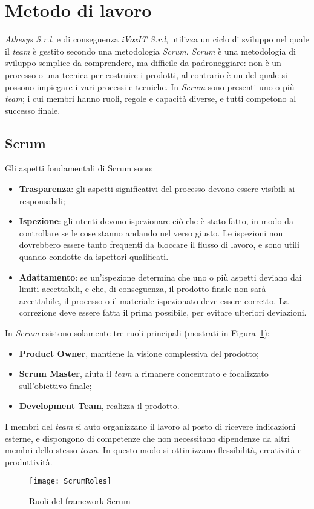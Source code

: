 \section{Metodo di lavoro}
\textit{Athesys S.r.l}, e di conseguenza \textit{iVoxIT S.r.l}, utilizza un ciclo di sviluppo  nel quale il \textit{team} è gestito secondo una metodologia \textit{Scrum}. \textit{Scrum} è una metodologia di sviluppo semplice da comprendere, ma difficile da padroneggiare: non è un processo o una tecnica per costruire i prodotti, al contrario è un  del quale si possono impiegare i vari processi e tecniche. In \textit{Scrum} sono presenti uno o più \textit{team}; i cui membri hanno ruoli, regole e capacità diverse, e tutti competono al successo finale.

\subsection{Scrum}
 Gli aspetti fondamentali di Scrum sono:
\begin{itemize}
\item \textbf{Trasparenza}: gli aspetti significativi del processo devono essere visibili ai responsabili;
\item \textbf{Ispezione}: gli utenti devono ispezionare ciò che è stato fatto, in modo da controllare se le cose stanno andando nel verso giusto. Le ispezioni non dovrebbero essere tanto frequenti da bloccare il flusso di lavoro, e sono utili quando condotte da ispettori qualificati.
\item \textbf{Adattamento}: se un'ispezione determina che uno o più aspetti deviano dai limiti accettabili, e che, di conseguenza, il prodotto finale non sarà accettabile, il processo o il materiale ispezionato deve essere corretto. La correzione deve essere fatta il prima possibile, per evitare ulteriori deviazioni.
\end{itemize}
In \textit{Scrum} esistono solamente tre ruoli principali (mostrati in Figura~\ref{fig:scrumroles}):
\begin{itemize}
\item \textbf{Product Owner}, mantiene la visione complessiva del prodotto;
\item \textbf{Scrum Master}, aiuta il \textit{team} a rimanere concentrato e focalizzato sull'obiettivo finale;
\item \textbf{Development Team}, realizza il prodotto.
\end{itemize}
I membri del \textit{team} si auto organizzano il lavoro al posto di ricevere indicazioni esterne, e dispongono di competenze che non necessitano dipendenze da altri membri dello stesso \textit{team}. In questo modo si ottimizzano flessibilità, creatività e produttività.
\begin{figure}[h]
\begin{center}
\texttt{[image: ScrumRoles]}
\caption[Ruoli del framework Scrum]{Ruoli del framework Scrum\protect\footnotemark}
\label{fig:scrumroles}
\end{center}
\end{figure}
